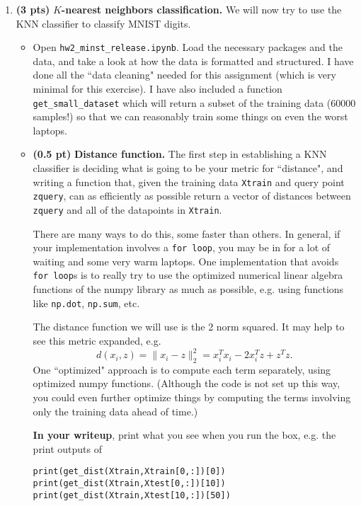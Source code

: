 \documentclass{article}
\newcommand{\showpoints}[1]{\textbf{(#1)}}
\begin{document}
\begin{enumerate}
\begin{enumerate}
\end{enumerate}



\item  \showpoints{3 pts}  \textbf{$K$-nearest neighbors classification.} We will now try to use the KNN classifier to classify MNIST digits. 

\begin{itemize}
\item Open \texttt{hw2\_minst\_release.ipynb}. Load the necessary packages and the data, and take a look at how the data is formatted and structured. I have done all the ``data cleaning" needed for this assignment (which is very minimal for this exercise). I have also included a function \texttt{get\_small\_dataset} which will return a subset of the training data (60000 samples!) so that we can reasonably train some things on even the worst laptops. 

\item  \showpoints{0.5 pt}  \textbf{Distance function.} The first step in establishing a KNN classifier is deciding what is going to be your metric for ``distance", and writing a function that, given the training data \texttt{Xtrain} and query point \texttt{zquery}, can as efficiently as possible return a vector of distances between \texttt{zquery} and all of the datapoints in \texttt{Xtrain}. 

There are many ways to do this, some faster than others. In general, if your implementation involves a \texttt{for loop}, you may be in for a lot of waiting and some very warm laptops. One implementation that avoids \texttt{for loop}s is to really try to use the optimized numerical linear algebra functions of the numpy library as much as possible, e.g. using functions like \texttt{np.dot}, \texttt{np.sum}, etc. 

The distance function we will use is the 2 norm squared. It may help to see this metric expanded, e.g. 
\[
d(x_i,z) = \|x_i-z\|_2^2 = x_i^Tx_i - 2x_i^Tz + z^Tz.
\]
One ``optimized" approach is to compute each term separately, using optimized numpy functions. 
(Although the code is not set up this way, you could even further optimize things by computing the terms involving only the training data ahead of time.) 

\textbf{In your writeup}, print what you see when you run the box, e.g. the print outputs of

\begin{verbatim}
print(get_dist(Xtrain,Xtrain[0,:])[0])
print(get_dist(Xtrain,Xtest[0,:])[10])
print(get_dist(Xtrain,Xtest[10,:])[50])
\end{verbatim}




\end{itemize}
\end{enumerate}
\end{document}

